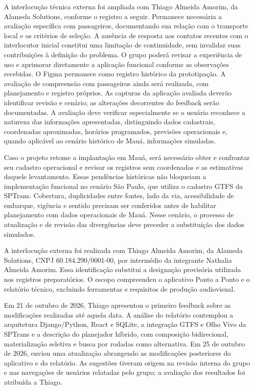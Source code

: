 \documentclass[12pt,oneside,a4paper,brazil,chapter=TITLE]{abntex2}
\begin{document}
A interlocução técnica externa foi ampliada com Thiago Almeida Amorim, da Alameda Solutions, conforme o registro a seguir. Permanece necessária a avaliação específica com passageiros, documentando sua relação com o transporte local e os critérios de seleção. A ausência de resposta aos contatos recentes com o interlocutor inicial constitui uma limitação de continuidade, sem invalidar suas contribuições à definição do problema. O grupo poderá revisar a experiência de uso e aprimorar diretamente a aplicação funcional conforme as observações recebidas. O Figma permanece como registro histórico da prototipação. A avaliação de compreensão com passageiros ainda será realizada, com planejamento e registro próprios. As capturas da aplicação avaliada deverão identificar revisão e cenário; as alterações decorrentes do feedback serão documentadas. A avaliação deve verificar especialmente se o usuário reconhece a natureza das informações apresentadas, distinguindo dados cadastrais, coordenadas aproximadas, horários programados, previsões operacionais e, quando aplicável ao cenário histórico de Mauá, informações simuladas.

Caso o projeto retome a implantação em Mauá, será necessário obter e confrontar seu cadastro operacional e revisar os registros sem coordenadas e as estimativas daquele levantamento. Essas pendências históricas não bloqueiam a implementação funcional no cenário São Paulo, que utiliza o cadastro GTFS da SPTrans. Cobertura, duplicidades entre fontes, lado da via, acessibilidade de embarque, vigência e sentido precisam ser conferidos antes de habilitar planejamento com dados operacionais de Mauá. Nesse cenário, o processo de atualização e de revisão das divergências deve preceder a substituição dos dados simulados.

\begingroup\setlength{\parskip}{8pt}
A interlocução externa foi realizada com Thiago Almeida Amorim, da Alameda Solutions, CNPJ 60.184.290/0001-00, por intermédio da integrante Nathalia Almeida Amorim. Essa identificação substitui a designação provisória utilizada nos registros preparatórios. O escopo compreendeu o aplicativo Ponto a Ponto e o relatório técnico, excluindo ferramentas e requisitos de produção audiovisual.

Em 21 de outubro de 2026, Thiago apresentou o primeiro feedback sobre as modificações realizadas até aquela data. A análise do relatório contemplou a arquitetura Django/Python, React e SQLite, a integração GTFS e Olho Vivo da SPTrans e a descrição do planejador híbrido, com composição bidirecional, materialização seletiva e busca por rodadas como alternativa. Em 25 de outubro de 2026, enviou uma atualização abrangendo as modificações posteriores do aplicativo e do relatório. As sugestões tiveram origem na revisão interna do grupo e nas navegações de usuários relatadas pelo grupo; a avaliação dos resultados foi atribuída a Thiago.
\end{document}
